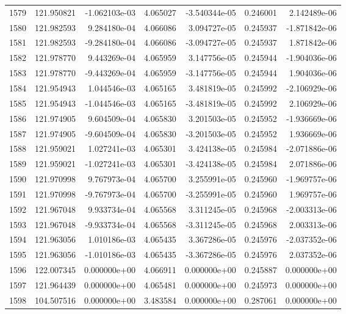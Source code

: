 \begin{tabular}{rrrrrrr}
1579 & 121.950821 & -1.062103e-03 &  4.065027 & -3.540344e-05 &    0.246001 &  2.142489e-06 \\
1580 & 121.982593 &  9.284180e-04 &  4.066086 &  3.094727e-05 &    0.245937 & -1.871842e-06 \\
1581 & 121.982593 & -9.284180e-04 &  4.066086 & -3.094727e-05 &    0.245937 &  1.871842e-06 \\
1582 & 121.978770 &  9.443269e-04 &  4.065959 &  3.147756e-05 &    0.245944 & -1.904036e-06 \\
1583 & 121.978770 & -9.443269e-04 &  4.065959 & -3.147756e-05 &    0.245944 &  1.904036e-06 \\
1584 & 121.954943 &  1.044546e-03 &  4.065165 &  3.481819e-05 &    0.245992 & -2.106929e-06 \\
1585 & 121.954943 & -1.044546e-03 &  4.065165 & -3.481819e-05 &    0.245992 &  2.106929e-06 \\
1586 & 121.974905 &  9.604509e-04 &  4.065830 &  3.201503e-05 &    0.245952 & -1.936669e-06 \\
1587 & 121.974905 & -9.604509e-04 &  4.065830 & -3.201503e-05 &    0.245952 &  1.936669e-06 \\
1588 & 121.959021 &  1.027241e-03 &  4.065301 &  3.424138e-05 &    0.245984 & -2.071886e-06 \\
1589 & 121.959021 & -1.027241e-03 &  4.065301 & -3.424138e-05 &    0.245984 &  2.071886e-06 \\
1590 & 121.970998 &  9.767973e-04 &  4.065700 &  3.255991e-05 &    0.245960 & -1.969757e-06 \\
1591 & 121.970998 & -9.767973e-04 &  4.065700 & -3.255991e-05 &    0.245960 &  1.969757e-06 \\
1592 & 121.967048 &  9.933734e-04 &  4.065568 &  3.311245e-05 &    0.245968 & -2.003313e-06 \\
1593 & 121.967048 & -9.933734e-04 &  4.065568 & -3.311245e-05 &    0.245968 &  2.003313e-06 \\
1594 & 121.963056 &  1.010186e-03 &  4.065435 &  3.367286e-05 &    0.245976 & -2.037352e-06 \\
1595 & 121.963056 & -1.010186e-03 &  4.065435 & -3.367286e-05 &    0.245976 &  2.037352e-06 \\
1596 & 122.007345 &  0.000000e+00 &  4.066911 &  0.000000e+00 &    0.245887 &  0.000000e+00 \\
1597 & 121.964439 &  0.000000e+00 &  4.065481 &  0.000000e+00 &    0.245973 &  0.000000e+00 \\
1598 & 104.507516 &  0.000000e+00 &  3.483584 &  0.000000e+00 &    0.287061 &  0.000000e+00 \\

\end{tabular}

